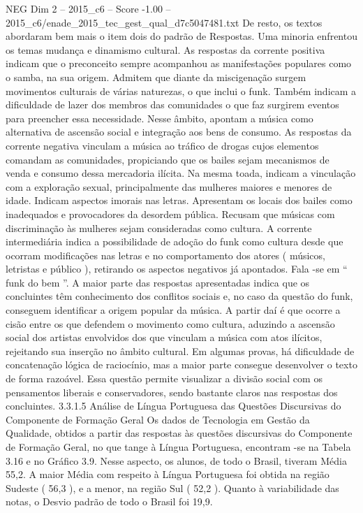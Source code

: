 \begin{textsample}{NEG Dim 2 – 2015\_c6 – Score -1.00 – 2015\_c6/enade\_2015\_tec\_gest\_qual\_d7c5047481.txt}
De resto, os textos abordaram bem mais o item dois do padrão de Respostas.
Uma minoria enfrentou os temas mudança e dinamismo cultural.
As respostas da corrente positiva indicam que o preconceito sempre acompanhou as manifestações populares como o samba, na sua origem.
Admitem que diante da miscigenação surgem movimentos culturais de várias naturezas, o que inclui o funk.
Também indicam a dificuldade de lazer dos membros das comunidades o que faz surgirem eventos para preencher essa necessidade.
Nesse âmbito, apontam a música como alternativa de ascensão social e integração aos bens de consumo.
As respostas da corrente negativa vinculam a música ao tráfico de drogas cujos elementos comandam as comunidades, propiciando que os bailes sejam mecanismos de venda e consumo dessa mercadoria ilícita.
Na mesma toada, indicam a vinculação com a exploração sexual, principalmente das mulheres maiores e menores de idade.
Indicam aspectos imorais nas letras.
Apresentam os locais dos bailes como inadequados e provocadores da desordem pública.
Recusam que músicas com discriminação às mulheres sejam consideradas como cultura.
A corrente intermediária indica a possibilidade de adoção do funk como cultura desde que ocorram modificações nas letras e no comportamento dos atores ( músicos, letristas e público ), retirando os aspectos negativos já apontados.
Fala -se em “ funk do bem ”.
A maior parte das respostas apresentadas indica que os concluintes têm conhecimento dos conflitos sociais e, no caso da questão do funk, conseguem identificar a origem popular da música.
A partir daí é que ocorre a cisão entre os que defendem o movimento como cultura, aduzindo a ascensão social dos artistas envolvidos dos que vinculam a música com atos ilícitos, rejeitando sua inserção no âmbito cultural.
Em algumas provas, há dificuldade de concatenação lógica de raciocínio, mas a maior parte consegue desenvolver o texto de forma razoável.
Essa questão permite visualizar a divisão social com os pensamentos liberais e conservadores, sendo bastante claros nas respostas dos concluintes. 3.3.1.5 Análise de Língua Portuguesa das Questões Discursivas do Componente de Formação Geral Os dados de Tecnologia em Gestão da Qualidade, obtidos a partir das respostas às questões discursivas do Componente de Formação Geral, no que tange à Língua Portuguesa, encontram -se na Tabela 3.16 e no Gráfico 3.9.
Nesse aspecto, os alunos, de todo o Brasil, tiveram Média 55,2.
A maior Média com respeito à Língua Portuguesa foi obtida na região Sudeste ( 56,3 ), e a menor, na região Sul ( 52,2 ).
Quanto à variabilidade das notas, o Desvio padrão de todo o Brasil foi 19,9.

\end{textsample}
